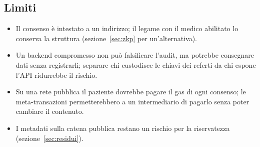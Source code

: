 \subsection{Limiti}
\begin{itemize}
  \item Il consenso è intestato a un indirizzo; il legame con il medico abilitato lo conserva la struttura (sezione~\ref{sec:zkp} per un'alternativa).
  \item Un backend compromesso non può falsificare l'audit, ma potrebbe consegnare dati senza registrarli; separare chi custodisce le chiavi dei referti da chi espone l'API ridurrebbe il rischio.
  \item Su una rete pubblica il paziente dovrebbe pagare il gas di ogni consenso; le meta-transazioni\cite{eip2771} permetterebbero a un intermediario di pagarlo senza poter cambiare il contenuto.
  \item I metadati sulla catena pubblica restano un rischio per la riservatezza (sezione~\ref{sec:residui}).
\end{itemize}
